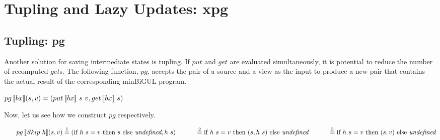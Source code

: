\section{Tupling and Lazy Updates: xpg} \label{sect:xpg}
\subsection{Tupling: pg} \label{sect:pg}

Another solution for saving intermediate states is tupling. If $put$ and $get$ are evaluated simultaneously, it is potential to reduce the number of recomputed $get$s. The following function, $pg$, accepts the pair of a source and a view as the input to produce a new pair that contains the actual result of the corresponding minBiGUL program.

\begin{definition}
    $pg \, [\![bx]\!] (s, v) = (put \, [\![bx]\!] \ s \ v, get \, [\![bx]\!] \ s)$
\end{definition}



\noindent Now, let us see how we construct $pg$ respectively.

    \noindent $\tabs{2} \pg{Skip \ h}{s}{v} \overset{1}{=} (\sif{h \ s = v}{s}{\textit{undefined}}, h \ s) \\
        \tab \qtab \overset{2}{=} \sif{h \ s = v}{(s, h \ s)}{\textit{undefined}} \\
        \tab \qtab \overset{3}{=} \sif{h \ s = v}{(s, v)}{\textit{undefined}}$
        
